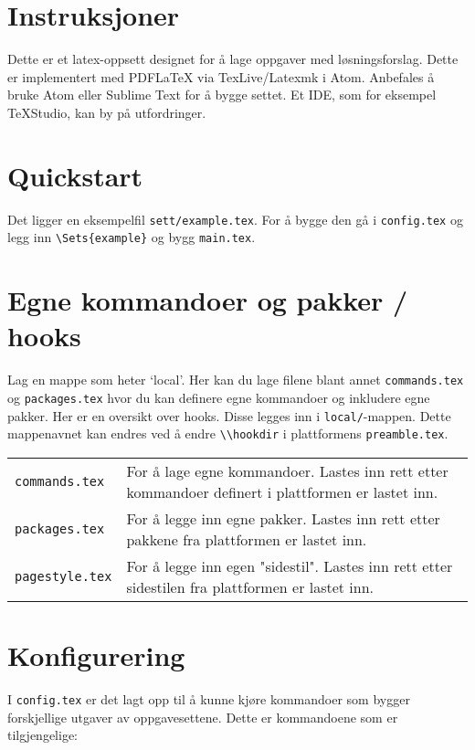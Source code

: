 \documentclass{article}
\def\platformdir{.}
\begin{document}

\lstset{language=[LaTeX]TeX}
\section*{Instruksjoner}
\noindent Dette er et latex-oppsett designet for å lage oppgaver med løsningsforslag. Dette er implementert med PDFLaTeX via TexLive/Latexmk i Atom. Anbefales å bruke Atom eller Sublime Text for å bygge settet. Et IDE, som for eksempel TeXStudio, kan by på utfordringer.\\

\section*{Quickstart}
Det ligger en eksempelfil \lstinline{sett/example.tex}. For å bygge den gå i \lstinline{config.tex} og legg inn
\lstinline|\Sets{example}| og bygg \lstinline{main.tex}.

\section*{Egne kommandoer og pakker / hooks}
Lag en mappe som heter `local'. Her kan du lage filene blant annet \lstinline{commands.tex} og \lstinline{packages.tex} hvor du kan definere egne kommandoer og inkludere egne pakker. Her er en oversikt over hooks. Disse legges inn i \lstinline{local/}-mappen. Dette mappenavnet kan endres ved å endre \lstinline{\\hookdir} i plattformens \lstinline{preamble.tex}.\\
\begin{tabularx}{\textwidth}{lX}
	\lstinline{commands.tex} & For å lage egne kommandoer. Lastes inn rett etter kommandoer definert i plattformen er lastet inn.\\
	\lstinline{packages.tex} & For å legge inn egne pakker. Lastes inn rett etter pakkene fra plattformen er lastet inn.\\
	\lstinline{pagestyle.tex} & For å legge inn egen "sidestil". Lastes inn rett etter sidestilen fra plattformen er lastet inn.
\end{tabularx}

\section*{Konfigurering}
I \lstinline|config.tex| er det lagt opp til å kunne kjøre kommandoer som bygger forskjellige utgaver av oppgavesettene.
Dette er kommandoene som er tilgjengelige:\\[2em]
\end{document}
